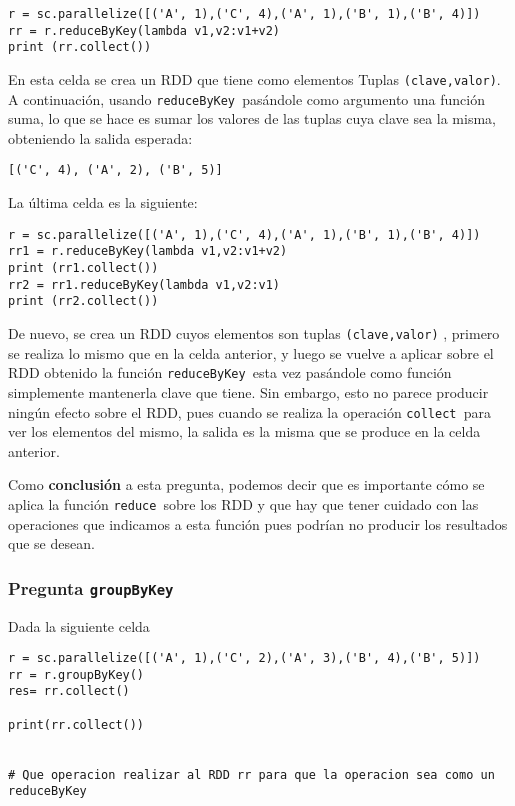 \documentclass[11pt]{article}
\def\inline{\lstinline[basicstyle=\ttfamily,keywordstyle={}]}
\begin{document}
\begin{verbatim}
r = sc.parallelize([('A', 1),('C', 4),('A', 1),('B', 1),('B', 4)])
rr = r.reduceByKey(lambda v1,v2:v1+v2)
print (rr.collect())
\end{verbatim}

En esta celda se crea un RDD que tiene como elementos Tuplas  \inline{(clave,valor)}. A continuación, usando \inline{reduceByKey }pasándole como argumento una función suma, lo que se hace es sumar los valores de las tuplas cuya clave sea la misma, obteniendo la salida esperada:
\begin{verbatim}
[('C', 4), ('A', 2), ('B', 5)]
\end{verbatim}

La última celda es la siguiente:
\begin{verbatim}
r = sc.parallelize([('A', 1),('C', 4),('A', 1),('B', 1),('B', 4)])
rr1 = r.reduceByKey(lambda v1,v2:v1+v2)
print (rr1.collect())
rr2 = rr1.reduceByKey(lambda v1,v2:v1)
print (rr2.collect())
\end{verbatim}

De nuevo, se crea un RDD cuyos elementos son tuplas  \inline{(clave,valor)} , primero se realiza lo mismo que en la celda anterior, y luego se vuelve a aplicar sobre el RDD obtenido la función \inline{reduceByKey }esta vez pasándole como función simplemente mantenerla clave que tiene. Sin embargo, esto no parece producir ningún efecto sobre el RDD, pues cuando se realiza la operación  \inline{collect }para ver los elementos del mismo, la salida es la misma que se produce en la celda anterior.

Como \textbf{conclusión} a esta pregunta, podemos decir que es importante cómo se aplica la función \inline{reduce }sobre los RDD y que hay que tener cuidado con las operaciones que indicamos a esta función pues podrían no producir los resultados que se desean. 

\subsubsection*{ Pregunta  \inline{groupByKey}}

Dada la siguiente celda
\begin{verbatim}
r = sc.parallelize([('A', 1),('C', 2),('A', 3),('B', 4),('B', 5)])
rr = r.groupByKey()
res= rr.collect()

print(rr.collect())


# Que operacion realizar al RDD rr para que la operacion sea como un reduceByKey
\end{verbatim}
\end{document}

